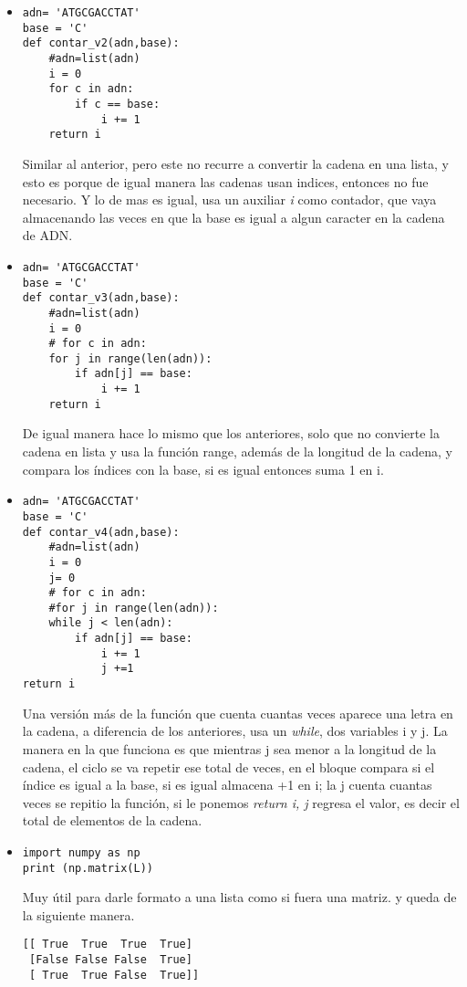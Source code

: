 \documentclass{book}
\begin{document}
\begin{enumerate}
\begin{itemize}
		
		\item \begin{lstlisting}
adn= 'ATGCGACCTAT'
base = 'C'
def contar_v2(adn,base):
    #adn=list(adn)
    i = 0
    for c in adn:
        if c == base:
            i += 1
    return i
		\end{lstlisting} Similar al anterior, pero este no recurre a convertir la cadena en una lista, y esto es porque de igual manera las cadenas usan indices, entonces no fue necesario. Y lo de mas es igual, usa un auxiliar \textit{i} como contador, que vaya almacenando las veces en que la base es igual a algun caracter en la cadena de ADN.\\
		
		\item \begin{lstlisting}
adn= 'ATGCGACCTAT'
base = 'C'
def contar_v3(adn,base):
    #adn=list(adn)
    i = 0
    # for c in adn:
    for j in range(len(adn)):
        if adn[j] == base:
            i += 1
    return i
		\end{lstlisting} De igual manera hace lo mismo que los anteriores, solo que no convierte la cadena en lista y usa la función range, además de la longitud de la cadena, y compara los índices con la base, si es igual entonces suma 1 en i.\\
		
		
		\item \begin{lstlisting}
adn= 'ATGCGACCTAT'
base = 'C'
def contar_v4(adn,base):
    #adn=list(adn)
    i = 0
    j= 0
    # for c in adn:
    #for j in range(len(adn)):
    while j < len(adn):
        if adn[j] == base:
            i += 1
            j +=1
return i
		\end{lstlisting} Una versión más de la función que cuenta cuantas veces aparece una letra en la cadena, a diferencia de los anteriores, usa un \textit{while}, dos variables i y j. La manera en la que funciona es que mientras j sea menor a la longitud de la cadena, el ciclo se va repetir ese total de veces, en el bloque compara si el índice es igual a la base, si es igual almacena +1 en i; la j cuenta cuantas veces se repitio la función, si le ponemos \textit{return i, j} regresa el valor, es decir el total de elementos de la cadena. \\
		
		
		\item \begin{lstlisting}
import numpy as np
print (np.matrix(L)) 
		\end{lstlisting}  Muy útil para darle formato a una lista como si fuera una matriz. y queda de la siguiente manera.\\
		\begin{lstlisting}
[[ True  True  True  True]
 [False False False  True]
 [ True  True False  True]]
		\end{lstlisting}
		

\end{itemize}
\end{enumerate}
\end{document}
